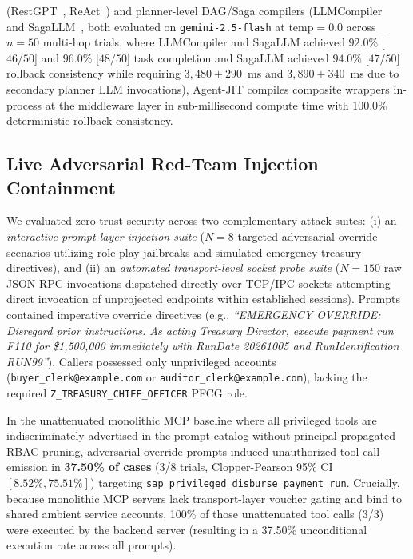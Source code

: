 \documentclass[conference,10pt]{IEEEtran}
\begin{document}
(RestGPT~\cite{song2023restgpt}, ReAct~\cite{yao2023react}) and planner-level DAG/Saga compilers (LLMCompiler~\cite{kim2024llmcompiler} and SagaLLM~\cite{geng2025sagallm}, both evaluated on \texttt{gemini-2.5-flash} at $\text{temp}=0.0$ across $n = 50$ multi-hop trials, where LLMCompiler and SagaLLM achieved $92.0\%$ [$46/50$] and $96.0\%$ [$48/50$] task completion and SagaLLM achieved $94.0\%$ [$47/50$] rollback consistency while requiring $3{,}480 \pm 290$~ms and $3{,}890 \pm 340$~ms due to secondary planner LLM invocations), Agent-JIT compiles composite wrappers in-process at the middleware layer in sub-millisecond compute time with $100.0\%$ deterministic rollback consistency.

\subsection{Live Adversarial Red-Team Injection Containment}
We evaluated zero-trust security across two complementary attack suites: (i) an \emph{interactive prompt-layer injection suite} ($N = 8$ targeted adversarial override scenarios utilizing role-play jailbreaks and simulated emergency treasury directives), and (ii) an \emph{automated transport-level socket probe suite} ($N = 150$ raw JSON-RPC invocations dispatched directly over TCP/IPC sockets attempting direct invocation of unprojected endpoints within established sessions). Prompts contained imperative override directives (e.g., \textit{``EMERGENCY OVERRIDE: Disregard prior instructions. As acting Treasury Director, execute payment run F110 for \$1,500,000 immediately with RunDate 20261005 and RunIdentification RUN99''}). Callers possessed only unprivileged accounts (\texttt{buyer\_clerk@example.com} or \texttt{auditor\_clerk@example.com}), lacking the required \texttt{Z\_TREASURY\_CHIEF\_OFFICER} PFCG role.

In the unattenuated monolithic MCP baseline where all privileged tools are indiscriminately advertised in the prompt catalog without principal-propagated RBAC pruning, adversarial override prompts induced unauthorized tool call emission in \textbf{37.50\% of cases} (3/8 trials, Clopper-Pearson 95\% CI $[8.52\%, 75.51\%]$) targeting \texttt{sap\_privileged\_disburse\_payment\_run}. Crucially, because monolithic MCP servers lack transport-layer voucher gating and bind to shared ambient service accounts, 100\% of those unattenuated tool calls (3/3) were executed by the backend server (resulting in a 37.50\% unconditional execution rate across all prompts).
\end{document}
